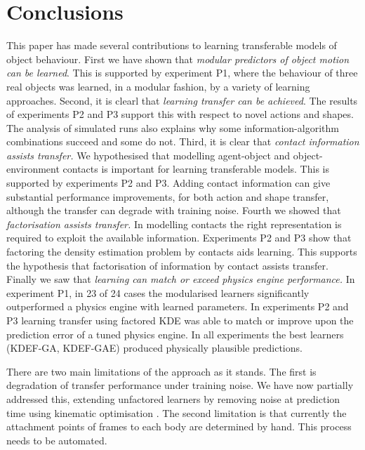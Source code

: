 
\section{Conclusions}\label{sec:Discussion}

This paper has made several contributions to learning transferable models of object behaviour. First we have shown that {\em modular predictors of object motion can be learned}. This is supported by experiment P1, where the behaviour of three real objects was learned, in a modular fashion, by a variety of learning approaches. Second, it is clearl that {\em learning transfer can be achieved}. The results of experiments P2 and P3 support this with respect to novel actions and shapes. The analysis of simulated runs also explains why some information-algorithm combinations succeed and some do not. Third, it is clear that {\em contact information assists transfer.} We hypothesised that modelling agent-object and object-environment contacts is important for learning transferable models. This is supported by experiments P2 and P3. Adding contact information can give substantial performance improvements, for both action and shape transfer, although the transfer can degrade with training noise. Fourth we showed that {\em factorisation assists transfer.} In modelling contacts the right representation is required to exploit the available information. Experiments P2 and P3 show that factoring the density estimation problem by contacts aids learning. This supports the hypothesis that factorisation of information by contact assists transfer.
Finally we saw that {\em learning can match or exceed physics engine performance.} In experiment P1, in 23 of 24 cases the modularised learners significantly outperformed a physics engine with learned parameters. In experiments P2 and P3 learning transfer using factored KDE was able to match or improve upon the prediction error of a tuned physics engine. In all experiments the best learners (KDEF-GA, KDEF-GAE) produced physically plausible predictions. 

There are two main limitations of the approach as it stands. The first is degradation of transfer performance under training noise. We have now partially addressed this, extending unfactored learners by removing noise at prediction time using kinematic optimisation \cite{belter2014iros}. The second limitation is that currently the attachment points of frames to each body are determined by hand. This process needs to be automated.

